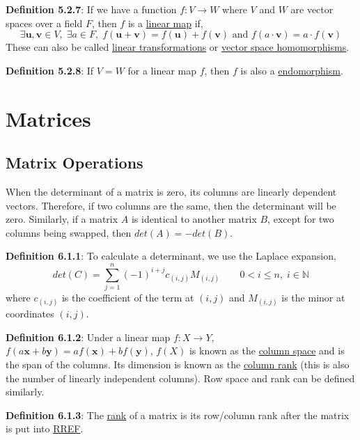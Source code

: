 \documentclass{article}
\newcommand{\separate}[1] {\vspace{#1 pt}\noindent}
\newcommand{\N}{\mathbb{N}}
\newcommand{\definition}[2]{\textbf{Definition #1}: #2\label{def:#1}}
\begin{document}
\separate{7}\definition{5.2.7}{If we have a function \(f:V \rightarrow W\) where \(V\) and \(W\) are vector spaces over a field \(F\), then \(f\) is a \underline{linear map} if,}
\begin{equation}
    \exists \mathbf{u},\mathbf{v} \in V,\; \exists a \in F,\; f(\mathbf{u} + \mathbf{v}) = f(\mathbf{u}) + f(\mathbf{v}) \text{ and } f(a\cdot\mathbf{v}) = a\cdot f(\mathbf{v})
\end{equation}
These can also be called \underline{linear transformations} or \underline{vector space homomorphisms}.

\separate{7}\definition{5.2.8}{If \(V = W\) for a linear map \(f\), then \(f\) is also a \underline{endomorphism}.}

\newpage\section{Matrices}

\subsection{Matrix Operations}

When the determinant of a matrix is zero, its columns are linearly dependent vectors. Therefore, if two columns are the same, then the determinant will be zero. Similarly, if a matrix \(A\) is identical to another matrix \(B\), except for two columns being swapped, then \(det(A) = -det(B)\).

\separate{7}\definition{6.1.1}{To calculate a determinant, we use the Laplace expansion,
\begin{equation}
    det(C) = \sum_{j=1}^{n} (-1)^{i+j} c_{(i,j)} M_{(i,j)} \qquad 0 < i \leq n,\;i \in \N
\end{equation}
where \(c_{(i,j)}\) is the coefficient of the term at \((i,j)\) and \(M_{(i,j)}\) is the minor at coordinates \((i,j)\).}

\separate{7}\definition{6.1.2}{Under a linear map \(f:X\rightarrow Y\), \(f(a\mathbf{x} + b\mathbf{y}) = af(\mathbf{x}) + bf(\mathbf{y})\), \(f(X)\) is known as the \underline{column space} and is the span of the columns. Its dimension is known as the \underline{column rank} (this is also the number of linearly independent columns). Row space and rank can be defined similarly.}

\separate{7}\definition{6.1.3}{The \underline{rank} of a matrix is its row/column rank after the matrix is put into \hyperref[def:6.2.6]{RREF}.}
\end{document}
